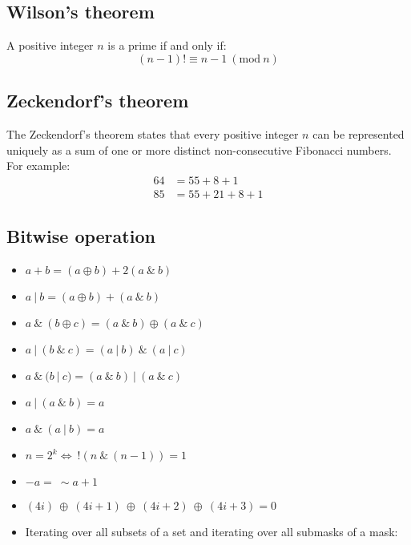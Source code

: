\subsection{Wilson's theorem}
A positive integer $n$ is a prime if and only if:
\[ (n - 1)! \equiv n - 1\ (\text{mod}\ n)\]

\subsection{Zeckendorf’s theorem}
The Zeckendorf's theorem states that every positive integer $n$ can be represented uniquely as a sum of one or more 
distinct non-consecutive Fibonacci numbers. For example:
	\vspace{-0.45cm}
	\begin{align*}
		64 &= 55 + 8 + 1 \\ 
		85 &= 55 + 21 + 8 + 1
	\end{align*}
	\vspace{-0.45cm}

\subsection{Bitwise operation}
\begin{multicols}{2}
\vspace{-\topsep}
\begin{itemize}
  	\setlength{\parskip}{0pt}
 	\setlength{\itemsep}{0pt plus 1pt}
	\item $a + b = (a \oplus b) + 2(a\ \&\ b)$
	\item $a\ |\ b = (a \oplus b) + (a\ \&\ b)$
	\item $a\ \&\ (b \oplus c) = (a\ \&\ b) \oplus (a\ \&\ c)$
	\item $a\ |\ (b\ \&\ c) = (a\ |\ b)\ \&\ (a\ |\ c)$
	\item $a\ \&\ (b\ |\ c) = (a\ \&\ b)\ |\ (a\ \&\ c)$
  	\item $a\ |\ (a\ \&\ b) = a$
	\item $a\ \&\ (a\ |\ b) = a$
	\item $n = 2 ^ k \Leftrightarrow\ !(n\ \&\ (n - 1)) = 1$
	\item $-a =\ \sim a + 1$
	\item $(4i)\ \oplus\ (4i + 1)\ \oplus\ (4i + 2)\ \oplus\ (4i + 3) = 0$
\end{itemize}
\vspace{-\topsep}
\end{multicols}
\begin{itemize}
	\item Iterating over all subsets of a set and iterating over all submasks of a mask:
\end{itemize}

